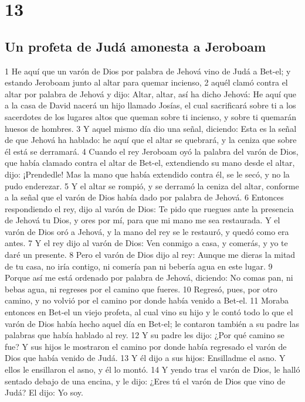 \chapter{13}

\section*{Un profeta de Judá amonesta a Jeroboam}

1 He aquí que un varón de Dios por palabra de Jehová vino de Judá a Bet-el; y estando Jeroboam junto al altar para quemar incienso,
2 aquél clamó contra el altar por palabra de Jehová y dijo: Altar, altar, así ha dicho Jehová: He aquí que a la casa de David nacerá un hijo llamado Josías, el cual sacrificará sobre ti a los sacerdotes de los lugares altos que queman sobre ti incienso, y sobre ti quemarán huesos de hombres. 
3 Y aquel mismo día dio una señal, diciendo: Esta es la señal de que Jehová ha hablado: he aquí que el altar se quebrará, y la ceniza que sobre él está se derramará.
4 Cuando el rey Jeroboam oyó la palabra del varón de Dios, que había clamado contra el altar de Bet-el, extendiendo su mano desde el altar, dijo: ¡Prendedle! Mas la mano que había extendido contra él, se le secó, y no la pudo enderezar.
5 Y el altar se rompió, y se derramó la ceniza del altar, conforme a la señal que el varón de Dios había dado por palabra de Jehová.
6 Entonces respondiendo el rey, dijo al varón de Dios: Te pido que ruegues ante la presencia de Jehová tu Dios, y ores por mí, para que mi mano me sea restaurada. Y el varón de Dios oró a Jehová, y la mano del rey se le restauró, y quedó como era antes.
7 Y el rey dijo al varón de Dios: Ven conmigo a casa, y comerás, y yo te daré un presente.
8 Pero el varón de Dios dijo al rey: Aunque me dieras la mitad de tu casa, no iría contigo, ni comería pan ni bebería agua en este lugar.
9 Porque así me está ordenado por palabra de Jehová, diciendo: No comas pan, ni bebas agua, ni regreses por el camino que fueres.
10 Regresó, pues, por otro camino, y no volvió por el camino por donde había venido a Bet-el.
11 Moraba entonces en Bet-el un viejo profeta, al cual vino su hijo y le contó todo lo que el varón de Dios había hecho aquel día en Bet-el; le contaron también a su padre las palabras que había hablado al rey.
12 Y su padre les dijo: ¿Por qué camino se fue? Y sus hijos le mostraron el camino por donde había regresado el varón de Dios que había venido de Judá.
13 Y él dijo a sus hijos: Ensilladme el asno. Y ellos le ensillaron el asno, y él lo montó.
14 Y yendo tras el varón de Dios, le halló sentado debajo de una encina, y le dijo: ¿Eres tú el varón de Dios que vino de Judá? El dijo: Yo soy.
